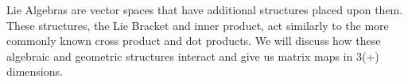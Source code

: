 \documentclass[12 pt]{article}
\begin{document}
Lie Algebras are vector spaces that have additional structures placed upon them. These structures, the Lie Bracket and inner product, act similarly to the more commonly known cross product and dot products. We will discuss how these algebraic and geometric structures interact and give us matrix maps in 3(+) dimensions.
\end{document}
